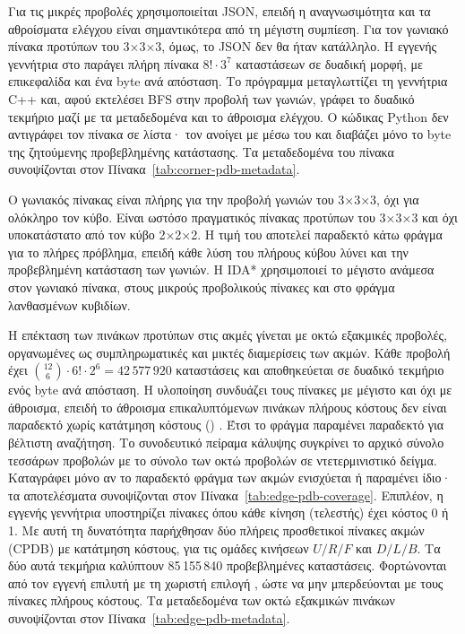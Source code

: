 Για τις μικρές προβολές χρησιμοποιείται JSON, επειδή η αναγνωσιμότητα και τα αθροίσματα ελέγχου είναι σημαντικότερα από τη μέγιστη συμπίεση. Για τον γωνιακό πίνακα προτύπων του 3×3×3, όμως, το JSON δεν θα ήταν κατάλληλο. Η εγγενής γεννήτρια στο  παράγει πλήρη πίνακα \(8!\cdot3^7\) καταστάσεων σε δυαδική μορφή, με επικεφαλίδα και ένα byte ανά απόσταση. Το πρόγραμμα  μεταγλωττίζει τη γεννήτρια C++ και, αφού εκτελέσει BFS στην προβολή των γωνιών, γράφει το δυαδικό τεκμήριο μαζί με τα μεταδεδομένα και το άθροισμα ελέγχου. Ο κώδικας Python δεν αντιγράφει τον πίνακα σε λίστα· τον ανοίγει με  μέσω του  και διαβάζει μόνο το byte της ζητούμενης προβεβλημένης κατάστασης. Τα μεταδεδομένα του πίνακα συνοψίζονται στον Πίνακα~\ref{tab:corner-pdb-metadata}.

\begin{table}[htbp]\centering

\caption{Μεταδεδομένα του γωνιακού πίνακα προτύπων του 3×3×3: πλήθος προβεβλημένων καταστάσεων, πληρότητα, μέγιστη απόσταση, μέγεθος δυαδικού αρχείου και χρόνος παραγωγής, από το τεκμήριο .}
\label{tab:corner-pdb-metadata}
\end{table}

Ο γωνιακός πίνακας είναι πλήρης για την προβολή γωνιών του 3×3×3, όχι για ολόκληρο τον κύβο. Είναι ωστόσο πραγματικός πίνακας προτύπων του 3×3×3 και όχι υποκατάστατο από τον κύβο 2×2×2. Η τιμή του αποτελεί παραδεκτό κάτω φράγμα για το πλήρες πρόβλημα, επειδή κάθε λύση του πλήρους κύβου λύνει και την προβεβλημένη κατάσταση των γωνιών. Η IDA* χρησιμοποιεί το μέγιστο ανάμεσα στον γωνιακό πίνακα, στους μικρούς προβολικούς πίνακες και στο φράγμα λανθασμένων κυβιδίων.

Η επέκταση των πινάκων προτύπων στις ακμές γίνεται με οκτώ εξακμικές προβολές, οργανωμένες ως συμπληρωματικές και μικτές διαμερίσεις των ακμών. Κάθε προβολή έχει \(\binom{12}{6}\cdot6!\cdot2^6=42\,577\,920\) καταστάσεις και αποθηκεύεται σε δυαδικό τεκμήριο ενός byte ανά απόσταση. Η υλοποίηση συνδυάζει τους πίνακες με μέγιστο και όχι με άθροισμα, επειδή το άθροισμα επικαλυπτόμενων πινάκων πλήρους κόστους δεν είναι παραδεκτό χωρίς κατάτμηση κόστους () \cite{felner2004additivePDB}. Έτσι το φράγμα παραμένει παραδεκτό για βέλτιστη αναζήτηση. Το συνοδευτικό πείραμα κάλυψης συγκρίνει το αρχικό σύνολο τεσσάρων προβολών με το σύνολο των οκτώ προβολών σε ντετερμινιστικό δείγμα. Καταγράφει μόνο αν το παραδεκτό φράγμα των ακμών ενισχύεται ή παραμένει ίδιο· τα αποτελέσματα συνοψίζονται στον Πίνακα~\ref{tab:edge-pdb-coverage}. Επιπλέον, η εγγενής γεννήτρια υποστηρίζει πίνακες όπου κάθε κίνηση (τελεστής) έχει κόστος 0 ή 1. Με αυτή τη δυνατότητα παρήχθησαν δύο πλήρεις προσθετικοί πίνακες ακμών (CPDB) με κατάτμηση κόστους, για τις ομάδες κινήσεων \(U/R/F\) και \(D/L/B\). Τα δύο αυτά τεκμήρια καλύπτουν 85\,155\,840 προβεβλημένες καταστάσεις. Φορτώνονται από τον εγγενή επιλυτή με τη χωριστή επιλογή , ώστε να μην μπερδεύονται με τους πίνακες πλήρους κόστους. Τα μεταδεδομένα των οκτώ εξακμικών πινάκων συνοψίζονται στον Πίνακα~\ref{tab:edge-pdb-metadata}.

